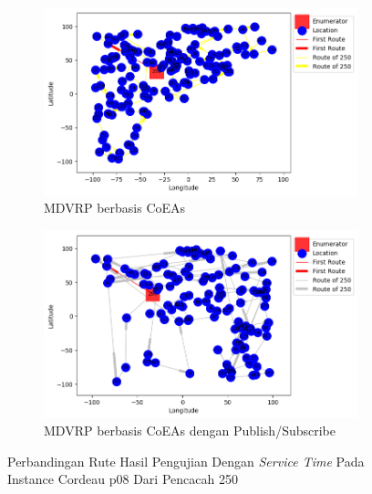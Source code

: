 \begin{figure}[H]
	\centering
	\begin{subfigure}[t]{\textwidth}
		\centering
		\includegraphics[width=\textwidth]{Resources/Images/cordeau_p08_tw/cordeau_p08_tw_250_coes}
		\caption{MDVRP berbasis CoEAs}
		\label{fig:cordeau_p08_tw_250_coes}
	\end{subfigure}
	\begin{subfigure}[t]{\textwidth}
		\centering
		\includegraphics[width=\textwidth]{Resources/Images/cordeau_p08_tw/cordeau_p08_tw_250_pubsub_coes}
		\caption{MDVRP berbasis CoEAs dengan Publish/Subscribe}
		\label{fig:cordeau_p08_tw_250_pubsub_coes}
	\end{subfigure}
	\caption{Perbandingan Rute Hasil Pengujian Dengan \textit{Service Time} Pada Instance Cordeau p08 Dari Pencacah 250}
	\label{fig:cordeau_p08_tw_250}
\end{figure}


